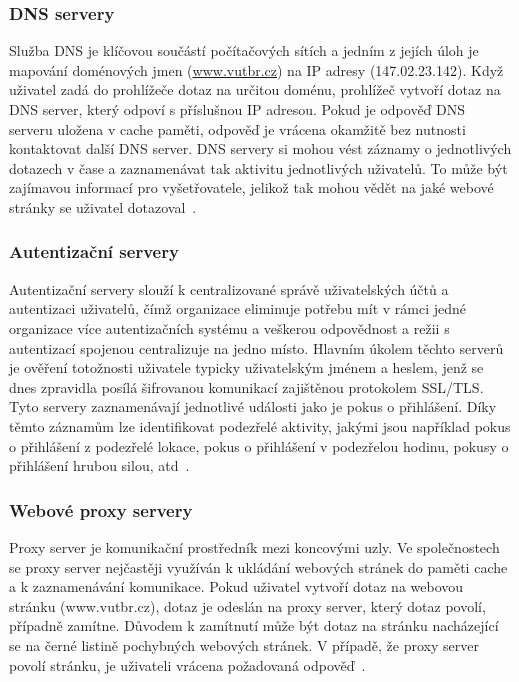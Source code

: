         \subsubsection*{\gls{DNS} servery}
            Služba \gls{DNS} je klíčovou součástí počítačových sítích a jedním z jejích úloh je mapování doménových jmen (\url{www.vutbr.cz}) na \gls{IP} adresy (147.02.23.142). Když uživatel zadá do prohlížeče dotaz na určitou doménu, prohlížeč vytvoří dotaz na \gls{DNS} server, který odpoví s příslušnou \gls{IP} adresou. Pokud je odpověď \gls{DNS} serveru uložena v cache paměti, odpověď je vrácena okamžitě bez nutnosti kontaktovat další \gls{DNS} server. DNS servery si mohou vést záznamy o jednotlivých dotazech v čase a zaznamenávat tak aktivitu jednotlivých uživatelů. To může být zajímavou informací pro vyšetřovatele, jelikož tak mohou vědět na jaké webové stránky se uživatel dotazoval~\cite{MatousekBookReference}.
        
        \subsubsection*{Autentizační servery}
            Autentizační servery slouží k centralizované správě uživatelských účtů a autentizaci uživatelů, čímž organizace eliminuje potřebu mít v rámci jedné organizace více autentizačních systému a veškerou odpovědnost a režii s autentizací spojenou centralizuje na jedno místo. Hlavním úkolem těchto serverů je ověření totožnosti uživatele typicky uživatelským jménem a heslem, jenž se dnes zpravidla posílá šifrovanou komunikací zajištěnou protokolem SSL/TLS. Tyto servery zaznamenávají jednotlivé události jako je pokus o přihlášení. Díky těmto záznamům lze identifikovat podezřelé aktivity, jakými jsou například pokus o přihlášení z podezřelé lokace, pokus o přihlášení v podezřelou hodinu, pokusy o přihlášení hrubou silou, atd~\cite{BookTrackingHackersReference}.
            
        \subsubsection*{Webové proxy servery}
            Proxy server je komunikační prostředník mezi koncovými uzly. Ve společnostech se proxy server nejčastěji využíván k ukládání webových stránek do paměti cache a k zaznamenávání komunikace. Pokud uživatel vytvoří dotaz na webovou stránku (www.vutbr.cz), dotaz je odeslán na proxy server, který dotaz povolí, případně zamítne. Důvodem k zamítnutí může být dotaz na stránku nacházející se na černé listině pochybných webových stránek. V případě, že proxy server povolí stránku, je uživateli vrácena požadovaná odpověď~\cite{ComputerNetworking}.

